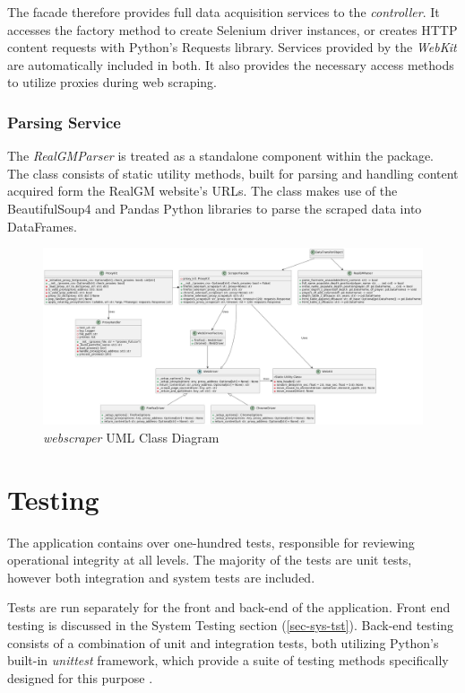 \documentclass{thesis-ekf}
\theoremstyle{definition}
\theoremstyle{remark}
\begin{document}
The facade therefore provides full data acquisition services to the \emph{controller}. It accesses the factory method to create Selenium driver instances, or creates HTTP content requests with Python's Requests library. Services provided by the \emph{WebKit} are automatically included in both. It also provides the necessary access methods to utilize proxies during web scraping.

\subsection{Parsing Service}
The \emph{RealGMParser} is treated as a standalone component within the package. The class consists of static utility methods, built for parsing and handling content acquired form the RealGM website's URLs. The class makes use of the BeautifulSoup4 and Pandas Python libraries to parse the scraped data into DataFrames.

\begin{figure}[H]
	\centering
	\includegraphics[width=1\linewidth]{img/class/webscraper}
	\caption{\emph{webscraper} UML Class Diagram}
	\label{img-webscraper-class}
\end{figure}


\chapter{Testing} \label{ch-testing}
The application contains over one-hundred tests, responsible for reviewing operational integrity at all levels. The majority of the tests are unit tests, however both integration and system tests are included. 

Tests are run separately for the front and back-end of the application. Front end testing is discussed in the System Testing section (\ref{sec-sys-tst}). Back-end testing consists of a combination of unit and integration tests, both utilizing Python's built-in \emph{unittest} framework, which provide a suite of testing methods specifically designed for this purpose \cite{unittest}.
\end{document}
